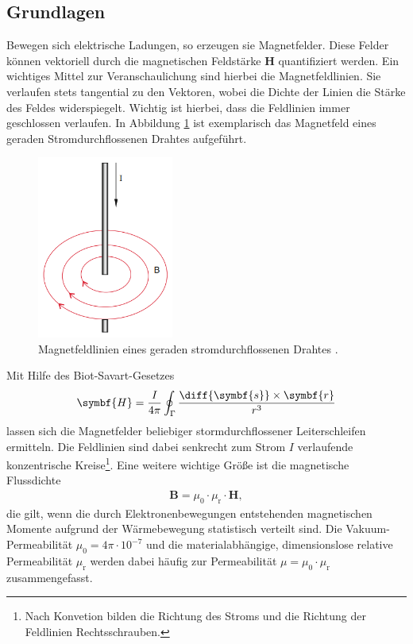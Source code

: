 \subsection{Grundlagen}
Bewegen sich elektrische Ladungen, so erzeugen sie Magnetfelder.
Diese Felder können vektoriell durch die magnetischen Feldstärke $\symbf{H}$ quantifiziert werden.
Ein wichtiges Mittel zur Veranschaulichung sind hierbei die Magnetfeldlinien.
Sie verlaufen stets tangential zu den Vektoren, wobei die Dichte der Linien die Stärke des Feldes widerspiegelt.
Wichtig ist hierbei, dass die Feldlinien immer geschlossen verlaufen.
In Abbildung \ref{fig:ger_stromdurchfl_draht} ist exemplarisch das Magnetfeld eines geraden Stromdurchflossenen Drahtes aufgeführt.
\begin{figure}[H]
    \centering
    \includegraphics*[height = 6cm]{./abbildungen/stromdurchfl_gerader_draht.png}
    \caption[]{Magnetfeldlinien eines geraden stromdurchflossenen Drahtes \cite[S. 86]{demtroeder2}.}
    \label{fig:ger_stromdurchfl_draht}
\end{figure}
%
\noindent
Mit Hilfe des Biot-Savart-Gesetzes 
\begin{align}
    \label{eq:biot_savart}
    \symbf{H} = \frac{I}{4 \pi} \oint_\Gamma \frac{\diff{\symbf{s}} \times \symbf{r}}{r^3}
\end{align}
lassen sich die Magnetfelder beliebiger stormdurchflossener Leiterschleifen \Gamma ermitteln.
Die Feldlinien sind dabei senkrecht zum Strom $I$ verlaufende konzentrische Kreise\footnote{Nach Konvetion
bilden die Richtung des Stroms und die Richtung der Feldlinien Rechtsschrauben.}.
\noindent
Eine weitere wichtige Größe ist die magnetische Flussdichte
\begin{align}
    \label{eq:B_mu_H}
    \symbf{B} = \mu_0 \cdot \mu_\text{r} \cdot \symbf{H},
\end{align}
die gilt, wenn die durch Elektronenbewegungen entstehenden magnetischen Momente aufgrund der 
Wärmebewegung statistisch verteilt sind.
Die Vakuum-Permeabilität $\mu_0 = 4 \pi \cdot 10^{-7}$ und die materialabhängige, dimensionslose relative Permeabilität $\mu_\text{r}$
werden dabei häufig zur Permeabilität $\mu = \mu_0 \cdot \mu_\text{r}$ zusammengefasst.

